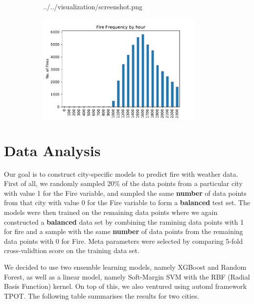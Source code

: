 \documentclass[10pt]{article}
\begin{document}
\begin{figure}[H]
\begin{subfigure}[t]{0.45\textwidth}
        {../../visualization/screenshot.png}
    \end{subfigure}
    \begin{subfigure}[t]{0.45\textwidth}
        \caption{}
        \centering
        \includegraphics[width=0.9\textwidth]{Allfire.pdf}
    \end{subfigure}
\end{figure}

\section{Data Analysis}

Our goal is to construct city-specific models to predict fire with weather
data. First of all, we randomly sampled 20\% of the data points from a
particular city with value 1 for the Fire variable, and sampled the same
\textbf{number} of data points from that city with value 0 for the Fire
variable to form a \textbf{balanced} test set. The models were then trained 
on the remaining data points where we again constructed a \textbf{balanced}
data set by combining the ramining data points with 1 for fire and a
sample with the same \textbf{number} of data points from the
remaining data points with 0 for Fire. Meta parameters were selected by
comparing 5-fold cross-validtion score on the training data set.\par

We decided to use two ensemble learning models, namely XGBoost and
Random Forest, as well as a linear model, namely Soft-Margin SVM with the RBF
(Radial Basis Function) kernel. On top of
this, we also ventured using automl framework TPOT. The following table
summarises the results for two cities.\par
\end{document}
